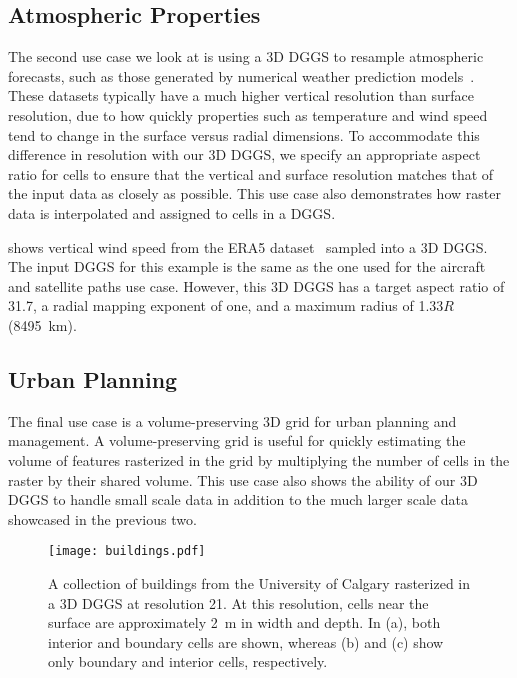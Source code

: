 \subsection{Atmospheric Properties} \label{chap:8:atmo}
The second use case we look at is using a 3D DGGS to resample atmospheric forecasts, such as those generated by numerical weather prediction models~\cite{ncepncar, era5}.
These datasets typically have a much higher vertical resolution than surface resolution, due to how quickly properties such as temperature and wind speed tend to change in the surface versus radial dimensions.
To accommodate this difference in resolution with our 3D DGGS, we specify an appropriate aspect ratio for cells to ensure that the vertical and surface resolution matches that of the input data as closely as possible.
This use case also demonstrates how raster data is interpolated and assigned to cells in a DGGS.





 shows vertical wind speed from the ERA5 dataset~\cite{era5} sampled into a 3D DGGS.
The input DGGS for this example is the same as the one used for the aircraft and satellite paths use case.
However, this 3D DGGS has a target aspect ratio of 31.7, a radial mapping exponent of one, and a maximum radius of 1.33$R$ (8495~km).


\subsection{Urban Planning} \label{chap:8:buildings}
The final use case is a volume-preserving 3D grid for urban planning and management.
A volume-preserving grid is useful for quickly estimating the volume of features rasterized in the grid by multiplying the number of cells in the raster by their shared volume.
This use case also shows the ability of our 3D DGGS to handle small scale data in addition to the much larger scale data showcased in the previous two.


\begin{figure}[ht!]
	\centering
	\texttt{[image: buildings.pdf]}
	\caption[Urban planning use case showing various rasterized buildings]{
		A collection of buildings from the University of Calgary rasterized in a 3D DGGS at resolution 21.
		At this resolution, cells near the surface are approximately 2~m in width and depth.
		In (a), both interior and boundary cells are shown, whereas (b) and (c) show only boundary and interior cells, respectively.
	}
	\label{fig:urbanplanning}
\end{figure}


